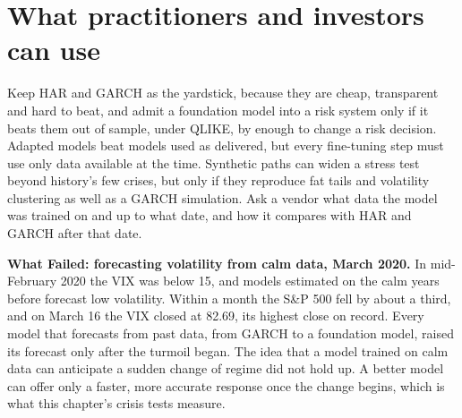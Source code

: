 \section{What practitioners and investors can use}
\label{sec:23-investors}

Keep HAR and GARCH as the yardstick, because they are cheap, transparent and hard to beat, and admit a foundation model into a risk system only if it beats them out of sample, under QLIKE, by enough to change a risk decision. Adapted models beat models used as delivered, but every fine-tuning step must use only data available at the time. Synthetic paths can widen a stress test beyond history's few crises, but only if they reproduce fat tails and volatility clustering as well as a GARCH simulation. Ask a vendor what data the model was trained on and up to what date, and how it compares with HAR and GARCH after that date.

\begin{callout}
\textbf{What Failed: forecasting volatility from calm data, March 2020.} In mid-February 2020 the VIX was below 15, and models estimated on the calm years before forecast low volatility. Within a month the S\&P 500 fell by about a third, and on March 16 the VIX closed at 82.69, its highest close on record. Every model that forecasts from past data, from GARCH to a foundation model, raised its forecast only after the turmoil began. The idea that a model trained on calm data can anticipate a sudden change of regime did not hold up. A better model can offer only a faster, more accurate response once the change begins, which is what this chapter's crisis tests measure.
\end{callout}

\makeatletter
{}
\makeatother

